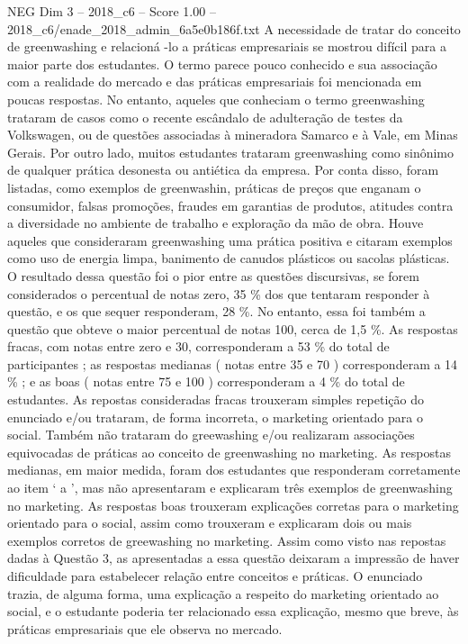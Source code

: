 \begin{textsample}{NEG Dim 3 – 2018\_c6 – Score 1.00 – 2018\_c6/enade\_2018\_admin\_6a5e0b186f.txt}
A necessidade de tratar do conceito de greenwashing e relacioná -lo a práticas empresariais se mostrou difícil para a maior parte dos estudantes.
O termo parece pouco conhecido e sua associação com a realidade do mercado e das práticas empresariais foi mencionada em poucas respostas.
No entanto, aqueles que conheciam o termo greenwashing trataram de casos como o recente escândalo de adulteração de testes da Volkswagen, ou de questões associadas à mineradora Samarco e à Vale, em Minas Gerais.
Por outro lado, muitos estudantes trataram greenwashing como sinônimo de qualquer prática desonesta ou antiética da empresa.
Por conta disso, foram listadas, como exemplos de greenwashin, práticas de preços que enganam o consumidor, falsas promoções, fraudes em garantias de produtos, atitudes contra a diversidade no ambiente de trabalho e exploração da mão de obra.
Houve aqueles que consideraram greenwashing uma prática positiva e citaram exemplos como uso de energia limpa, banimento de canudos plásticos ou sacolas plásticas.
O resultado dessa questão foi o pior entre as questões discursivas, se forem considerados o percentual de notas zero, 35 \% dos que tentaram responder à questão, e os que sequer responderam, 28 \%.
No entanto, essa foi também a questão que obteve o maior percentual de notas 100, cerca de 1,5 \%.
As respostas fracas, com notas entre zero e 30, corresponderam a 53 \% do total de participantes ; as respostas medianas ( notas entre 35 e 70 ) corresponderam a 14 \% ; e as boas ( notas entre 75 e 100 ) corresponderam a 4 \% do total de estudantes.
As repostas consideradas fracas trouxeram simples repetição do enunciado e/ou trataram, de forma incorreta, o marketing orientado para o social.
Também não trataram do greewashing e/ou realizaram associações equivocadas de práticas ao conceito de greenwashing no marketing.
As respostas medianas, em maior medida, foram dos estudantes que responderam corretamente ao item ‘ a ’, mas não apresentaram e explicaram três exemplos de greenwashing no marketing.
As respostas boas trouxeram explicações corretas para o marketing orientado para o social, assim como trouxeram e explicaram dois ou mais exemplos corretos de greewashing no marketing.
Assim como visto nas repostas dadas à Questão 3, as apresentadas a essa questão deixaram a impressão de haver dificuldade para estabelecer relação entre conceitos e práticas.
O enunciado trazia, de alguma forma, uma explicação a respeito do marketing orientado ao social, e o estudante poderia ter relacionado essa explicação, mesmo que breve, às práticas empresariais que ele observa no mercado.

\end{textsample}

